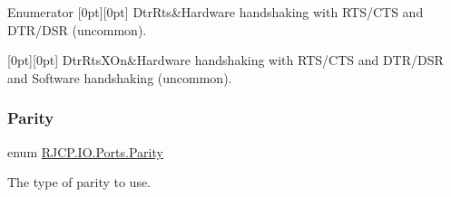\begin{DoxyEnumFields}{Enumerator}
[0pt][0pt]{}\mbox{\label{namespace_r_j_c_p_1_1_i_o_1_1_ports_a5328e888558ed5726b3fb7b8b692527ca1f691e91fa9dadee3f1af3ccbec47cab}} 
Dtr\+Rts&Hardware handshaking with R\+T\+S/\+C\+TS and D\+T\+R/\+D\+SR (uncommon). \\
\hline

[0pt][0pt]{}\mbox{\label{namespace_r_j_c_p_1_1_i_o_1_1_ports_a5328e888558ed5726b3fb7b8b692527ca39f247ee061241312d8ff325496af8f2}} 
Dtr\+Rts\+X\+On&Hardware handshaking with R\+T\+S/\+C\+TS and D\+T\+R/\+D\+SR and Software handshaking (uncommon). \\
\hline

\end{DoxyEnumFields}
\mbox{\label{namespace_r_j_c_p_1_1_i_o_1_1_ports_a35c8c760a80dd0392e605dd3ad169954}} 
\subsubsection{\texorpdfstring{Parity}{Parity}}
{\footnotesize\ttfamily enum \mbox{\hyperlink{namespace_r_j_c_p_1_1_i_o_1_1_ports_a35c8c760a80dd0392e605dd3ad169954}{R\+J\+C\+P.\+I\+O.\+Ports.\+Parity}}\hspace{0.3cm}{\ttfamily [strong]}}



The type of parity to use. 

